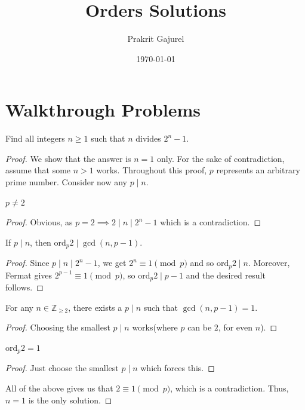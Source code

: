 \documentclass[11pt]{scrartcl}
\begin{document}
\title{Orders Solutions}
\author{Prakrit Gajurel}
\date{\today}
\maketitle

\section{Walkthrough Problems}

\begin{problem}
    Find all integers $n \ge 1$ such that $n$ divides $2^n - 1$.
\end{problem}

\begin{proof}
    We show that the answer is $n=1$ only. For the sake of contradiction, assume that some $n > 1$ works.
    Throughout this proof, $p$ represents an arbitrary prime number. Consider now any $p \mid n$.
    \begin{claim}
        $p \neq 2$
    \end{claim}
    \begin{proof}
        Obvious, as $p = 2 \implies 2 \mid n \mid 2^n - 1$ which is a contradiction.
    \end{proof}

    \begin{claim}
        If $p \mid n$, then $\text{ord}_p 2 \mid \gcd(n, p-1)$.
    \end{claim}
    \begin{proof}
        Since $p \mid n \mid 2^n - 1$, we get $2^n \equiv 1 \pmod{p}$ and so $\text{ord}_p 2 \mid n$. Moreover,
        Fermat gives $2^{p-1} \equiv 1 \pmod{p}$, so $\text{ord}_p 2 \mid p-1$ and the desired result follows.
    \end{proof}

    \begin{claim}
        For any $n \in \mathbb{Z}_{\ge 2}$, there exists a $p \mid n$ such that $\gcd(n, p-1) = 1$.
    \end{claim}
    \begin{proof}
        Choosing the smallest $p \mid n$ works(where $p$ can be $2$, for even $n$).
    \end{proof}

    \begin{claim}
        $\text{ord}_p 2 = 1$
    \end{claim}
    \begin{proof}
        Just choose the smallest $p \mid n$ which forces this.
    \end{proof}

    All of the above gives us that $2 \equiv 1 \pmod{p}$, which is a contradiction. Thus, $n=1$ is the only solution.
\end{proof}
\end{document}
